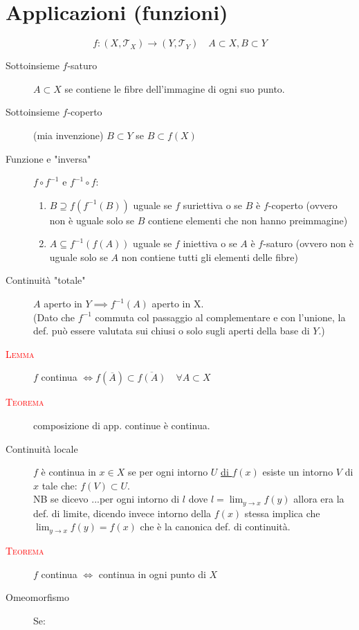 \documentclass[a4paper,10pt]{article}
\newcommand{\myth}{\normalfont \scshape \textcolor{red}}
\theoremstyle{remark}
\theoremstyle{definition}
\begin{document}
\section*{Applicazioni (funzioni)}
\begin{equation*}
    f:(X, \mathcal{T}_X) \to (Y, \mathcal{T}_Y) \quad A \subset X, B \subset Y
\end{equation*}
\begin{description}
\item[Sottoinsieme $f$-saturo] $A \subset X$ se contiene le fibre dell'immagine di ogni suo punto.
\item[Sottoinsieme $f$-coperto] (mia invenzione) $B \subset Y$ se $B \subset f(X)$
\item[Funzione e "inversa"] $f\circ f^{-1}$ e $f^{-1}\circ f$:
    \begin{enumerate}
        \item $B \supseteq f(f^{-1}(B))$ \qquad uguale se $f$ suriettiva o se $B$ è $f$-coperto (ovvero non è uguale solo se $B$ contiene elementi che non hanno preimmagine)
        \item $A \subseteq f^{-1}(f(A)) $ \qquad uguale se $f$ iniettiva o se $A$ è $f$-saturo (ovvero non è uguale solo se $A$ non contiene tutti gli elementi delle fibre)
    \end{enumerate}
    \item[Continuità "totale"] $A$ aperto in $Y \implies f^{-1}(A)$ aperto in X.
    \\ 
    (Dato che $f^{-1}$ commuta col passaggio al complementare e con l'unione, la def. può essere valutata sui chiusi o  solo sugli aperti della base di $Y$.)
    \item[\myth{Lemma}] $f$ continua $\iff f(\overline{A}) \subset \overline{f(A)} \quad \forall A \subset X$ 
    \item[\myth{Teorema}] composizione di app. continue è continua.
    \item[Continuità locale] $f$ è continua in $x \in X$ se per ogni intorno $U$ \underline{di $f(x)$} esiste un intorno $V$ di $x$ tale che: $f(V) \subset U$. \\
    NB se dicevo ...per ogni intorno di $l$ dove $l=\lim_{y\to x}f(y)$ allora era la def. di limite, dicendo invece intorno della $f(x)$ stessa implica che $\lim_{y\to x}f(y)=f(x)$ che è la canonica  def. di continuità.
    \item[\myth{Teorema}] $f$ continua $\iff$ continua in ogni punto di $X$
    \item[Omeomorfismo] Se:
    \begin{enumerate}

\end{enumerate}
\end{description}
\end{document}
